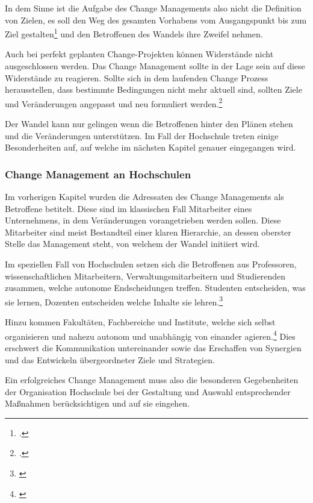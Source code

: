 In dem Sinne ist die Aufgabe des Change Managements also nicht die Definition von Zielen, es soll den Weg des gesamten Vorhabens vom Ausgangspunkt bis zum Ziel gestalten\footcite{lauer_change_2014} und den Betroffenen des Wandels ihre Zweifel nehmen.

Auch bei perfekt geplanten Change-Projekten können Widerstände nicht ausgeschlossen werden. Das Change Management sollte in der Lage sein auf diese Widerstände zu reagieren. Sollte sich in dem laufenden Change Prozess herausstellen, dass bestimmte Bedingungen nicht mehr aktuell sind, sollten Ziele und Veränderungen angepasst und neu formuliert werden.\footcite{fisch_veraenderungen_2008}

Der Wandel kann nur gelingen wenn die Betroffenen hinter den Plänen stehen und die Veränderungen unterstützen. Im Fall der Hochschule treten einige Besonderheiten auf, auf welche im nächsten Kapitel genauer eingegangen wird.

\subsubsection{Change Management an Hochschulen}
\label{subsubsection_change_management_an_HS}
Im vorherigen Kapitel wurden die Adressaten des Change Managements als Betroffene betitelt. Diese sind im klassischen Fall Mitarbeiter eines Unternehmens, in dem Veränderungen vorangetrieben werden sollen. Diese Mitarbeiter sind  meist Bestandteil einer klaren Hierarchie, an dessen oberster Stelle das Management steht, von welchem der Wandel initiiert wird. 

Im speziellen Fall von Hochschulen setzen sich die Betroffenen aus Professoren, wissenschaftlichen Mitarbeitern, Verwaltungsmitarbeitern und Studierenden zusammen, welche autonome Endscheidungen treffen. Studenten entscheiden, was sie lernen, Dozenten entscheiden welche Inhalte sie lehren.\footnote{\cite{hoelscher_wissenschaft_2011}}

Hinzu kommen Fakultäten, Fachbereiche und Institute, welche sich selbst organisieren und nahezu autonom und unabhängig von einander agieren.\footnote{\cite{fisch_veraenderungen_2008}} 
Dies erschwert die Kommunikation untereinander sowie das Erschaffen von Synergien und das Entwickeln übergeordneter Ziele und Strategien.

Ein erfolgreiches Change Management muss also die besonderen Gegebenheiten der Organisation Hochschule bei der Gestaltung und Auswahl entsprechender Maßnahmen berücksichtigen und auf sie eingehen.

